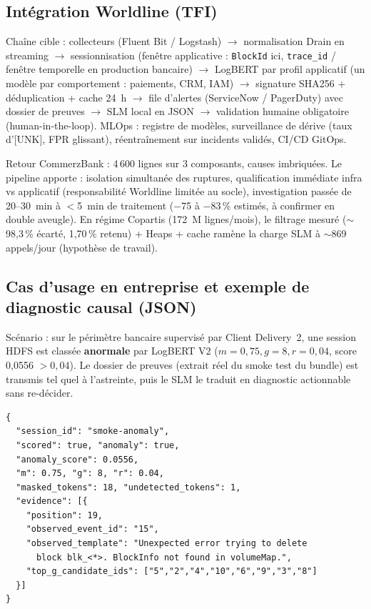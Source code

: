 \documentclass[12pt,a4paper]{report}
\begin{document}
\subsection{Intégration Worldline (TFI)}

Chaîne cible : collecteurs (Fluent Bit / Logstash) $\rightarrow$ normalisation Drain en streaming $\rightarrow$ sessionnisation (fenêtre applicative : \texttt{BlockId} ici, \texttt{trace\_id} / fenêtre temporelle en production bancaire) $\rightarrow$ LogBERT par profil applicatif (un modèle par comportement : paiements, CRM, IAM) $\rightarrow$ signature SHA256 + déduplication + cache 24~h $\rightarrow$ file d'alertes (ServiceNow / PagerDuty) avec dossier de preuves $\rightarrow$ SLM local en JSON $\rightarrow$ validation humaine obligatoire (human-in-the-loop). MLOps : registre de modèles, surveillance de dérive (taux d'[UNK], FPR glissant), réentraînement sur incidents validés, CI/CD GitOps.

Retour CommerzBank : 4\,600 lignes sur 3 composants, causes imbriquées. Le pipeline apporte : isolation simultanée des ruptures, qualification immédiate infra vs applicatif (responsabilité Worldline limitée au socle), investigation passée de 20--30~min à $<$5~min de traitement ($-$75 à $-$83\,\% estimés, à confirmer en double aveugle). En régime Copartis (172~M lignes/mois), le filtrage mesuré ($\sim$98,3\,\% écarté, 1,70\,\% retenu) + Heaps + cache ramène la charge SLM à $\sim$869 appels/jour (hypothèse de travail).

\subsection{Cas d'usage en entreprise et exemple de diagnostic causal (JSON)}

Scénario : sur le périmètre bancaire supervisé par Client Delivery~2, une session HDFS est classée \textbf{anormale} par LogBERT V2 ($m{=}0{,}75,g{=}8,r{=}0{,}04$, score 0,0556 $> 0{,}04$). Le dossier de preuves (extrait réel du smoke test du bundle) est transmis tel quel à l'astreinte, puis le SLM le traduit en diagnostic actionnable sans re-décider.

{\small\begin{verbatim}
{
  "session_id": "smoke-anomaly",
  "scored": true, "anomaly": true,
  "anomaly_score": 0.0556,
  "m": 0.75, "g": 8, "r": 0.04,
  "masked_tokens": 18, "undetected_tokens": 1,
  "evidence": [{
    "position": 19,
    "observed_event_id": "15",
    "observed_template": "Unexpected error trying to delete
      block blk_<*>. BlockInfo not found in volumeMap.",
    "top_g_candidate_ids": ["5","2","4","10","6","9","3","8"]
  }]
}
\end{verbatim}\par}
\end{document}
